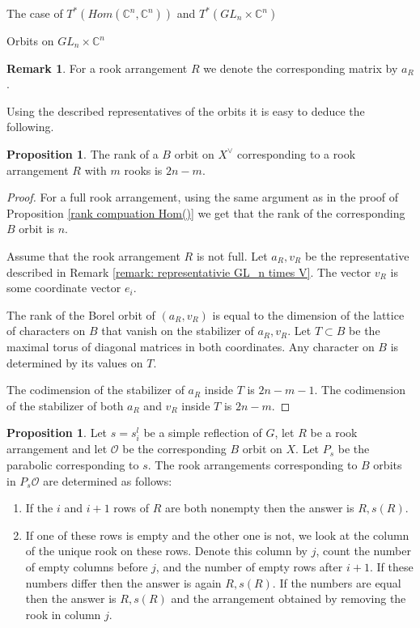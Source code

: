 \documentclass[12pt]{article}
\newcommand{\C}{\mathbb{C}}
\newcommand{\s}{\mathcal{O}}
\theoremstyle{plain}
\theoremstyle{definition}
\newtheorem{prop}[theorem]{Proposition}
\newtheorem{Remark}[theorem]{Remark}
\begin{document}
\begin{subsection}{The case of $T^*(Hom(\C^n,\C^n))$ and $T^*(GL_n\times \C^n)$}
\begin{subsubsection}{Orbits on $GL_n\times \C^n$}
\begin{Remark}
        For a rook arrangement $R$ we denote the corresponding matrix by $a_{R}$.
    \end{Remark}

    Using the described representatives of the orbits it is easy to deduce the following.

    \begin{prop}\label{rank computaion GL times V}
        The rank of a $B$ orbit on $X^\vee$ corresponding to a rook arrangement $R$ with $m$ rooks is $2n-m$.
    \end{prop}

    \begin{proof}
        For a full rook arrangement, using the same argument as in the proof of Proposition \ref{rank compuation Hom()} we get that the rank of the corresponding $B$ orbit is $n$.

        Assume that the rook arrangement $R$ is not full. Let $a_R,v_R$ be the representative described in Remark \ref{remark: representativie GL_n times V}. The vector $v_R$ is some coordinate vector $e_i$.

        The rank of the Borel orbit of $(a_R,v_R)$ is equal to the dimension of the lattice of characters on $B$ that vanish on the stabilizer of $a_R,v_R$. Let $T\subset B$ be the maximal torus of diagonal matrices in both coordinates. Any character on $B$ is determined by its values on $T$. 

         The codimension of the stabilizer of $a_R$ inside $T$ is $2n-m-1$. The codimension of the stabilizer of both $a_R$ and $v_R$ inside $T$ is $2n-m$.
        
    \end{proof}
    
    \begin{prop}\label{Borel orbits in Ps orbit}
        Let $s=s^l_i$ be a simple reflection of $G$, let $R$ be a rook arrangement and let $\s$ be the corresponding $B$ orbit on $X$. Let $P_s$ be the parabolic corresponding to $s$. The rook arrangements corresponding to $B$ orbits in $P_s\s$ are determined as follows:

        \begin{enumerate}
            \item If the $i$ and $i+1$ rows of $R$ are both nonempty then the answer is $R,s(R)$.
            \item If one of these rows is empty and the other one is not, we look at the column of the unique rook on these rows. Denote this column by $j$, count the number of empty columns before $j$, and the number of empty rows after $i+1$. If these numbers differ then the answer is again $R,s(R)$. If the numbers are equal then the answer is $R,s(R)$ and the arrangement obtained by removing the rook in column $j$.


\end{enumerate}
\end{prop}
\end{subsubsection}
\end{subsection}
\end{document}

